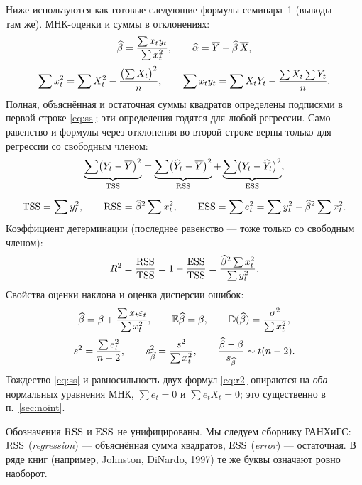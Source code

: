 Ниже используются как готовые следующие формулы семинара~1 (выводы — там же).
МНК-оценки и суммы в отклонениях:
\begin{gather}
  \widehat{\beta} = \frac{\sum x_ty_t}{\sum x_t^2},
  \qquad
  \widehat{\alpha} = \overline{Y} - \widehat{\beta}\,\overline{X},
  \label{eq:ols} \\[2pt]
  \sum x_t^2 = \sum X_t^2 - \frac{\bigl(\sum X_t\bigr)^2}{n},
  \qquad
  \sum x_ty_t = \sum X_tY_t - \frac{\sum X_t\sum Y_t}{n}.
  \label{eq:dev-sums}
\end{gather}
Полная, объяснённая и остаточная суммы квадратов определены подписями в первой
строке \eqref{eq:ss}; эти определения годятся для любой регрессии. Само
равенство и формулы через отклонения во второй строке верны только для
регрессии со свободным членом:
\begin{equation}
\begin{gathered}
  \underbrace{\sum\bigl(Y_t - \overline{Y}\bigr)^2}_{\mathrm{TSS}}
  =
  \underbrace{\sum\bigl(\widehat{Y}_t - \overline{Y}\bigr)^2}_{\mathrm{RSS}}
  +
  \underbrace{\sum\bigl(Y_t - \widehat{Y}_t\bigr)^2}_{\mathrm{ESS}},
  \\[6pt]
  \mathrm{TSS} = \sum y_t^2,
  \qquad
  \mathrm{RSS} = \widehat{\beta}^2\sum x_t^2,
  \qquad
  \mathrm{ESS} = \sum e_t^2 = \sum y_t^2 - \widehat{\beta}^2\sum x_t^2 .
\end{gathered}
\label{eq:ss}
\end{equation}
Коэффициент детерминации (последнее равенство — тоже только со свободным
членом):
\begin{equation}
  R^2 = \frac{\mathrm{RSS}}{\mathrm{TSS}} = 1 - \frac{\mathrm{ESS}}{\mathrm{TSS}}
      = \frac{\widehat{\beta}^2\sum x_t^2}{\sum y_t^2}.
  \label{eq:r2}
\end{equation}
Свойства оценки наклона и оценка дисперсии ошибок:
\begin{gather}
  \widehat{\beta} = \beta + \frac{\sum x_t\varepsilon_t}{\sum x_t^2},
  \qquad
  \mathbb{E}\widehat{\beta} = \beta,
  \qquad
  \mathbb{D}(\widehat{\beta}) = \frac{\sigma^2}{\sum x_t^2},
  \label{eq:var-b} \\[2pt]
  s^2 = \frac{\sum e_t^2}{n-2},
  \qquad
  s_{\widehat{\beta}}^2 = \frac{s^2}{\sum x_t^2},
  \qquad
  \frac{\widehat{\beta} - \beta}{s_{\widehat{\beta}}} \sim t(n-2).
  \label{eq:s2}
\end{gather}
Тождество \eqref{eq:ss} и равносильность двух формул \eqref{eq:r2} опираются на
\emph{оба} нормальных уравнения МНК, $\sum e_t = 0$ и $\sum e_tX_t = 0$; это
существенно в п.~\ref{sec:noint}.

\begin{remark}
Обозначения $\mathrm{RSS}$ и $\mathrm{ESS}$ не унифицированы. Мы следуем сборнику РАНХиГС:
$\mathrm{RSS}$ (\textit{regression}) — объяснённая сумма квадратов, $\mathrm{ESS}$
(\textit{error}) — остаточная. В ряде книг (например, Johnston, DiNardo, 1997)
те же буквы означают ровно наоборот.
\end{remark}

